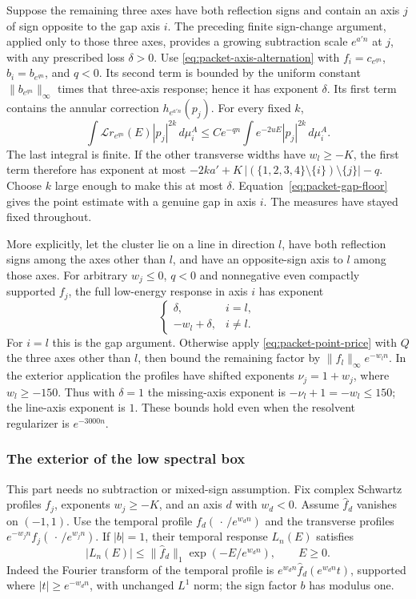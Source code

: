Suppose the remaining three axes have both reflection signs and contain
an axis $j$ of sign opposite to the gap axis $i$. The preceding finite
sign-change argument, applied only to those three axes, provides a growing
subtraction scale $e^{a'n}$ at $j$, with any prescribed loss $\delta>0$.
Use \eqref{eq:packet-axis-alternation} with $f_i=c_{e^{qn}}$,
$b_i=b_{e^{qn}}$, and $q<0$. Its second term is bounded by the uniform
constant $\|b_{e^{qn}}\|_\infty$ times that three-axis response; hence it
has exponent $\delta$. Its first term contains the annular correction
$h_{e^{a'n}}(p_j)$. For every fixed $k$,
\[
 \int\mathcal Lr_{e^{qn}}(E)|p_j|^{2k}\,d\mu_i^A
 \leq C e^{-qn}\int e^{-2uE}|p_j|^{2k}\,d\mu_i^A.
\]
The last integral is finite. If the other transverse widths have
$w_l\geq-K$, the first term therefore has exponent at most
$-2ka'+K\,|(\{1,2,3,4\}\setminus\{i\})\setminus\{j\}|-q$.
Choose $k$ large enough to make this at most $\delta$.
Equation~\eqref{eq:packet-gap-floor} gives the point estimate with a
genuine gap in axis $i$. The measures have stayed fixed throughout.

More explicitly, let the cluster lie on a line in direction $l$, have
both reflection signs among the axes other than $l$, and have an
opposite-sign axis to $l$ among those axes. For arbitrary $w_j\leq0$,
$q<0$ and nonnegative even compactly supported $f_j$, the full low-energy
response in axis $i$ has exponent
\begin{equation}\label{eq:packet-line-price}
 \begin{cases}\delta,&i=l,\\ -w_l+\delta,&i\ne l.\end{cases}
\end{equation}
For $i=l$ this is the gap argument. Otherwise apply
\eqref{eq:packet-point-price} with $Q$ the three axes other than $l$,
then bound the remaining factor by
$\|f_l\|_\infty e^{-w_ln}$. In the exterior application the profiles
have shifted exponents $\nu_j=1+w_j$, where $w_l\geq-150$. Thus with
$\delta=1$ the missing-axis exponent is $-\nu_l+1=-w_l\leq150$;
the line-axis exponent is $1$. These bounds hold even when the resolvent
regularizer is $e^{-3000n}$.

\subsubsection{The exterior of the low spectral box}

This part needs no subtraction or mixed-sign assumption. Fix complex
Schwartz profiles $f_j$, exponents $w_j\geq-K$, and an axis $d$ with
$w_d<0$. Assume $\widehat f_d$ vanishes on $(-1,1)$. Use the temporal
profile $f_d(\,\cdot\,/e^{w_dn})$ and the transverse profiles
$e^{-w_jn}f_j(\,\cdot\,/e^{w_jn})$. If $|b|=1$, their temporal response
$L_n(E)$ satisfies
\[
 |L_n(E)|\leq \|\widehat f_d\|_1\exp(-E/e^{w_dn}),\qquad E\geq0.
\]
Indeed the Fourier transform of the temporal profile is
$e^{w_dn}\widehat f_d(e^{w_dn}t)$, supported where
$|t|\geq e^{-w_dn}$, with unchanged $L^1$ norm; the sign factor $b$
has modulus one.

